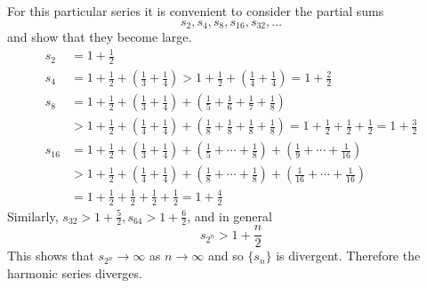 \begin{solution}
    For this particular series it is convenient to consider the partial sums
    \[s_2,s_4,s_8,s_{16},s_{32},\dots\]
    and show that they become large.
    \begin{align*}
        s_2 &= 1+\frac{1}{2} \\
        s_4 &= 1+\frac{1}{2}+\left(\frac{1}{3}+\frac{1}{4}\right)
        >1+\frac{1}{2}+\left(\frac{1}{4}+\frac{1}{4}\right)=1+\frac{2}{2} \\
        s_8 &= 1+\frac{1}{2}+\left(\frac{1}{3}+\frac{1}{4}\right)
        +\left(\frac{1}{5}+\frac{1}{6}+\frac{1}{7}+\frac{1}{8}\right) \\
        &> 1+\frac{1}{2}+\left(\frac{1}{4}+\frac{1}{4}\right)
        +\left(\frac{1}{8}+\frac{1}{8}+\frac{1}{8}+\frac{1}{8}\right)
        =1+\frac{1}{2}+\frac{1}{2}+\frac{1}{2}=1+\frac{3}{2} \\
        s_{16} &= 1+\frac{1}{2}+\left(\frac{1}{3}+\frac{1}{4}\right)
        +\left(\frac{1}{5}+\cdots+\frac{1}{8}\right)
        +\left(\frac{1}{9}+\cdots+\frac{1}{16}\right) \\
        &> 1+\frac{1}{2}+\left(\frac{1}{4}+\frac{1}{4}\right)
        +\left(\frac{1}{8}+\cdots+\frac{1}{8}\right)
        +\left(\frac{1}{16}+\cdots+\frac{1}{16}\right) \\
        &= 1+\frac{1}{2}+\frac{1}{2}+\frac{1}{2}+\frac{1}{2}=1+\frac{4}{2}
    \end{align*}
    Similarly, \(s_{32}>1+\frac{5}{2},s_{64}>1+\frac{6}{2}\), and in general
    \[s_{2^n}>1+\frac{n}{2}\]
    This shows that \(s_{2^n}\to\infty\) as \(n\to\infty\) and so \(\{s_n\}\)
    is divergent.
    Therefore the harmonic series diverges.
\end{solution}

